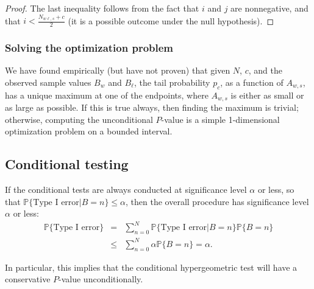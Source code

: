 \documentclass[runningheads]{llncs}
\begin{document}
\begin{proof}
The last inequality follows from the fact that $i$ and $j$ are nonnegative, and 
that $i < \frac{N_{w\ell,s}+c}{2}$ (it is a possible outcome under the null hypothesis).


\end{proof}

\subsubsection{Solving the optimization problem}

We have found empirically (but have not proven) that given $N$, $c$, and the observed sample values $B_w$ and $B_\ell$, the tail probability $p_c$, as a function of $A_{w,s}$,
has a unique maximum at one of the endpoints, where $A_{w,s}$ is either as small or as large as possible.
If this is true always, then finding the maximum is trivial;
otherwise, computing the unconditional $P$-value is a simple 1-dimensional optimization problem
on a bounded interval.

\subsection{Conditional testing}
If the conditional tests are always conducted at significance level $\alpha$ or less, so that
$\mathbb{P} \{\mbox{Type I error} | B = n\} \le \alpha$, then the
overall procedure has significance level $\alpha$ or less:
\begin{eqnarray}
    \mathbb{P} \{\mbox{Type I error}\} &=& \sum_{n=0}^N  \mathbb{P}\{\mbox{Type I error} |  B = n\} \mathbb{P} \{ B = n \} \nonumber \\
       & \le & \sum_{n=0}^N \alpha \mathbb{P} \{  B = n \}  =  \alpha.
\end{eqnarray}

In particular, this implies that the conditional hypergeometric test will have a conservative $P$-value unconditionally.





\end{document}
